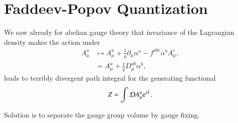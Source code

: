 \section{Faddeev-Popov Quantization}
We saw already for abelian gauge theory that invariance of the Lagrangian density makes the action under 
\begin{align}
   A^a_\mu &\mapsto A^a_\mu + \frac{1}{g} \partial_\mu \alpha^a - f^{abc} \alpha^b A_\mu^c, \\
           &= A^a_\mu + \frac{1}{g}D_{\mu}^{ab}\alpha^b ,
\end{align}
leads to terribly divergent  path integral for the generating functional
\begin{align*}
   Z = \int \mathcal{D} A_\mu^a \mathrm{e}^{iS}.
\end{align*}

Solution is to separate the gauge group volume by gauge fixing.

